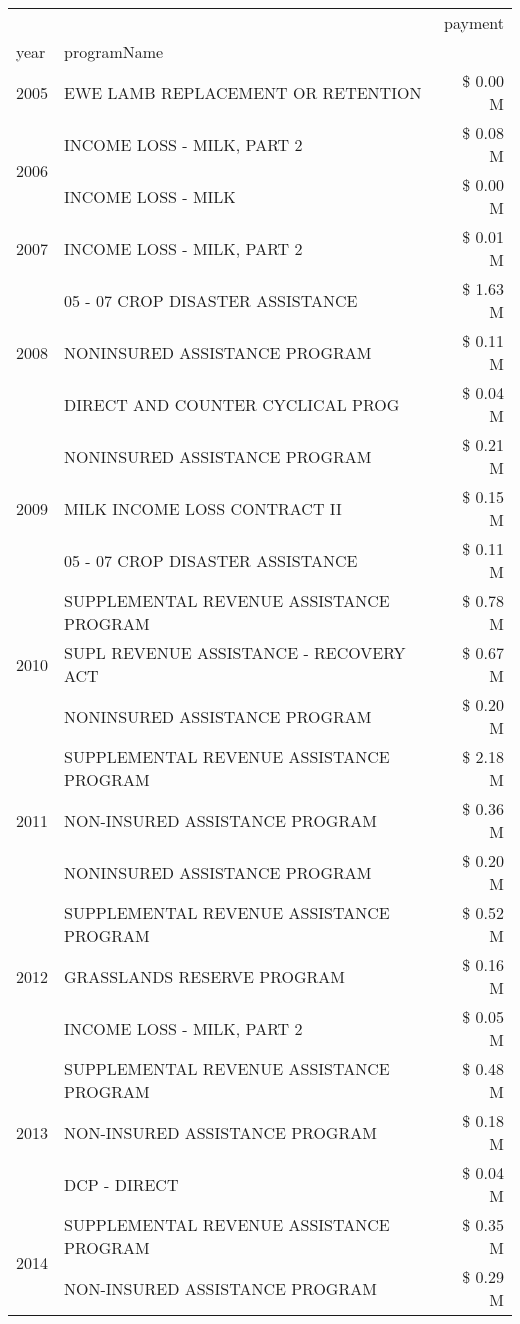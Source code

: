 \begin{tabular}{llr}
\toprule
 &  & payment \\
year & programName &  \\
\midrule
2005 & EWE LAMB REPLACEMENT OR RETENTION & \$ 0.00 M \\
\cline{1-3}
\multirow[t]{2}{*}{2006} & INCOME LOSS - MILK, PART 2 & \$ 0.08 M \\
 & INCOME LOSS - MILK & \$ 0.00 M \\
\cline{1-3}
2007 & INCOME LOSS - MILK, PART 2 & \$ 0.01 M \\
\cline{1-3}
\multirow[t]{3}{*}{2008} & 05 - 07 CROP DISASTER ASSISTANCE & \$ 1.63 M \\
 & NONINSURED ASSISTANCE PROGRAM & \$ 0.11 M \\
 & DIRECT AND COUNTER CYCLICAL PROG & \$ 0.04 M \\
\cline{1-3}
\multirow[t]{3}{*}{2009} & NONINSURED ASSISTANCE PROGRAM & \$ 0.21 M \\
 & MILK INCOME LOSS CONTRACT II & \$ 0.15 M \\
 & 05 - 07 CROP DISASTER ASSISTANCE & \$ 0.11 M \\
\cline{1-3}
\multirow[t]{3}{*}{2010} & SUPPLEMENTAL REVENUE ASSISTANCE PROGRAM & \$ 0.78 M \\
 & SUPL REVENUE ASSISTANCE - RECOVERY ACT & \$ 0.67 M \\
 & NONINSURED ASSISTANCE PROGRAM & \$ 0.20 M \\
\cline{1-3}
\multirow[t]{3}{*}{2011} & SUPPLEMENTAL REVENUE ASSISTANCE PROGRAM & \$ 2.18 M \\
 & NON-INSURED ASSISTANCE PROGRAM & \$ 0.36 M \\
 & NONINSURED ASSISTANCE PROGRAM & \$ 0.20 M \\
\cline{1-3}
\multirow[t]{3}{*}{2012} & SUPPLEMENTAL REVENUE ASSISTANCE PROGRAM & \$ 0.52 M \\
 & GRASSLANDS RESERVE PROGRAM & \$ 0.16 M \\
 & INCOME LOSS - MILK, PART 2 & \$ 0.05 M \\
\cline{1-3}
\multirow[t]{3}{*}{2013} & SUPPLEMENTAL REVENUE ASSISTANCE PROGRAM & \$ 0.48 M \\
 & NON-INSURED ASSISTANCE PROGRAM & \$ 0.18 M \\
 & DCP - DIRECT & \$ 0.04 M \\
\cline{1-3}
\multirow[t]{3}{*}{2014} & SUPPLEMENTAL REVENUE ASSISTANCE PROGRAM & \$ 0.35 M \\
 & NON-INSURED ASSISTANCE PROGRAM & \$ 0.29 M \\

\end{tabular}

